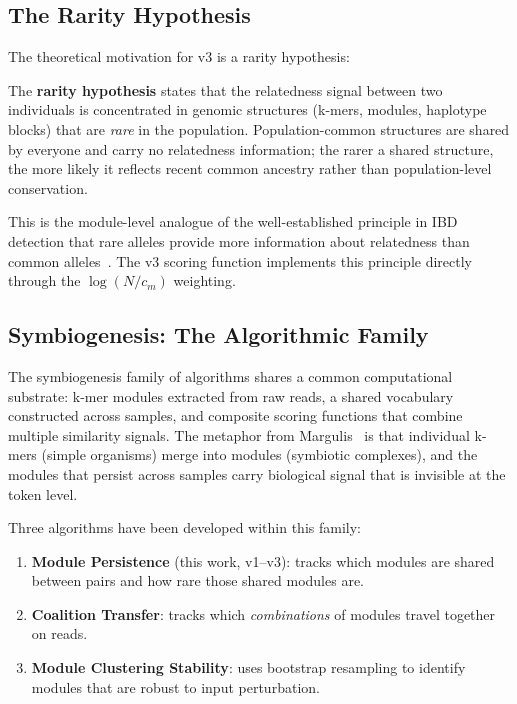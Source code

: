 \documentclass{../yalumba}
\begin{document}
\subsection{The Rarity Hypothesis}

The theoretical motivation for v3 is a rarity hypothesis:

\begin{definition}
The \textbf{rarity hypothesis} states that the relatedness signal between two
individuals is concentrated in genomic structures (k-mers, modules, haplotype
blocks) that are \emph{rare} in the population.  Population-common structures
are shared by everyone and carry no relatedness information; the rarer a shared
structure, the more likely it reflects recent common ancestry rather than
population-level conservation.
\end{definition}

This is the module-level analogue of the well-established principle in IBD
detection that rare alleles provide more information about relatedness than
common alleles~\cite{browning2012ibd, ralph2013ancestry}.  The v3 scoring
function implements this principle directly through the $\log(N / c_m)$
weighting.

\subsection{Symbiogenesis: The Algorithmic Family}

The symbiogenesis family of algorithms shares a common computational
substrate: k-mer modules extracted from raw reads, a shared vocabulary
constructed across samples, and composite scoring functions that combine
multiple similarity signals.  The metaphor from Margulis~\cite{margulis1998}
is that individual k-mers (simple organisms) merge into modules (symbiotic
complexes), and the modules that persist across samples carry biological
signal that is invisible at the token level.

Three algorithms have been developed within this family:

\begin{enumerate}
  \item \textbf{Module Persistence} (this work, v1--v3): tracks which modules
        are shared between pairs and how rare those shared modules are.
  \item \textbf{Coalition Transfer}: tracks which \emph{combinations} of
        modules travel together on reads.
  \item \textbf{Module Clustering Stability}: uses bootstrap resampling to
        identify modules that are robust to input perturbation.
\end{enumerate}
\end{document}

